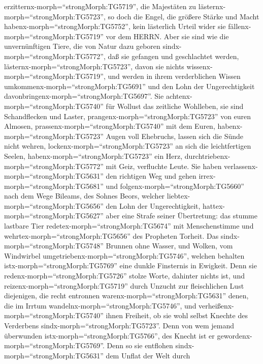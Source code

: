 erzitternx-morph=``strongMorph:TG5719'', die Majestäten zu
lästernx-morph=``strongMorph:TG5723'',  so doch die Engel,
die größere Stärke und Macht habenx-morph=``strongMorph:TG5752'', kein
lästerlich Urteil wider sie fällenx-morph=``strongMorph:TG5719'' vor dem
HERRN.  Aber sie sind wie die unvernünftigen Tiere, die von
Natur dazu geboren sindx-morph=``strongMorph:TG5772'', daß sie gefangen
und geschlachtet werden, lästernx-morph=``strongMorph:TG5723'', davon
sie nichts wissenx-morph=``strongMorph:TG5719'', und werden in ihrem
verderblichen Wissen umkommenx-morph=``strongMorph:TG5691''
 und den Lohn der Ungerechtigkeit
davonbringenx-morph=``strongMorph:TG5697''. Sie
achtenx-morph=``strongMorph:TG5740'' für Wollust das zeitliche
Wohlleben, sie sind Schandflecken und Laster,
prangenx-morph=``strongMorph:TG5723'' von euren Almosen,
prassenx-morph=``strongMorph:TG5740'' mit dem Euren, 
habenx-morph=``strongMorph:TG5723'' Augen voll Ehebruchs, lassen sich
die Sünde nicht wehren, lockenx-morph=``strongMorph:TG5723'' an sich die
leichtfertigen Seelen, habenx-morph=``strongMorph:TG5723'' ein Herz,
durchtriebenx-morph=``strongMorph:TG5772'' mit Geiz, verfluchte Leute.
 Sie haben verlassenx-morph=``strongMorph:TG5631'' den
richtigen Weg und gehen irrex-morph=``strongMorph:TG5681'' und
folgenx-morph=``strongMorph:TG5660'' nach dem Wege Bileams, des Sohnes
Beors, welcher liebtex-morph=``strongMorph:TG5656'' den Lohn der
Ungerechtigkeit,  hattex-morph=``strongMorph:TG5627'' aber
eine Strafe seiner Übertretung: das stumme lastbare Tier
redetex-morph=``strongMorph:TG5674'' mit Menschenstimme und
wehrtex-morph=``strongMorph:TG5656'' des Propheten Torheit.
 Das sindx-morph=``strongMorph:TG5748'' Brunnen ohne
Wasser, und Wolken, vom Windwirbel
umgetriebenx-morph=``strongMorph:TG5746'', welchen behalten
istx-morph=``strongMorph:TG5769'' eine dunkle Finsternis in Ewigkeit.
 Denn sie redenx-morph=``strongMorph:TG5726'' stolze Worte,
dahinter nichts ist, und reizenx-morph=``strongMorph:TG5719'' durch
Unzucht zur fleischlichen Lust diejenigen, die recht entronnen
warenx-morph=``strongMorph:TG5631'' denen, die im Irrtum
wandelnx-morph=``strongMorph:TG5746'',  und
verheißenx-morph=``strongMorph:TG5740'' ihnen Freiheit, ob sie wohl
selbst Knechte des Verderbens sindx-morph=``strongMorph:TG5723''. Denn
von wem jemand überwunden istx-morph=``strongMorph:TG5766'', des Knecht
ist er gewordenx-morph=``strongMorph:TG5769''.  Denn so sie
entflohen sindx-morph=``strongMorph:TG5631'' dem Unflat der Welt durch
